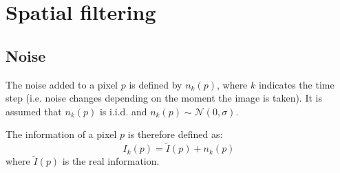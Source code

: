 \chapter{Spatial filtering}


\section{Noise}

The noise added to a pixel $p$ is defined by $n_k(p)$, 
where $k$ indicates the time step (i.e. noise changes depending on the moment the image is taken).
It is assumed that $n_k(p)$ is i.i.d. and $n_k(p) \sim \mathcal{N}(0, \sigma)$.

The information of a pixel $p$ is therefore defined as:
\[ I_k(p) = \tilde{I}(p) + n_k(p) \]
where $\tilde{I}(p)$ is the real information.

